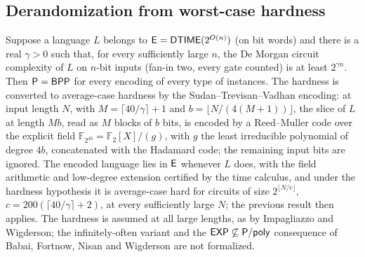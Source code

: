 \begin{result}
\subsection{Derandomization from worst-case hardness}
Suppose a language $L$ belongs to $\mathsf{E}=\mathsf{DTIME}(2^{O(n)})$ (on bit words) and
there is a real $\gamma>0$ such that, for every sufficiently large $n$, the De Morgan
circuit complexity of $L$ on $n$-bit inputs (fan-in two, every gate counted) is at
least $2^{\gamma n}$. Then $\mathsf{P}=\mathsf{BPP}$ for every encoding of every type of
instances. The hardness is converted to average-case hardness by the
Sudan--Trevisan--Vadhan encoding: at input length $N$, with $M=\lceil 40/\gamma\rceil+1$
and $b=\lfloor N/(4(M+1))\rfloor$, the slice of $L$ at length $Mb$, read as $M$ blocks
of $b$ bits, is encoded by a Reed--Muller code over the explicit field
$\mathbb{F}_{2^{4b}}=\mathbb{F}_2[X]/(g)$, with $g$ the least irreducible polynomial of
degree $4b$, concatenated with the Hadamard code; the remaining input bits are
ignored. The encoded language lies in $\mathsf{E}$ whenever $L$ does, with the field
arithmetic and low-degree extension certified by the time calculus, and under the
hardness hypothesis it is average-case hard for circuits of size
$2^{\lfloor N/c\rfloor}$, $c=200(\lceil 40/\gamma\rceil+2)$, at every sufficiently
large $N$; the previous result then applies. The hardness is assumed at all large
lengths, as by Impagliazzo and Wigderson; the infinitely-often variant and the
$\mathsf{EXP}\not\subseteq\mathsf{P/poly}$ consequence of Babai, Fortnow, Nisan and
Wigderson are not formalized.\citep{ImpagliazzoWigderson1997,SudanTrevisanVadhan2001}
\end{result}


